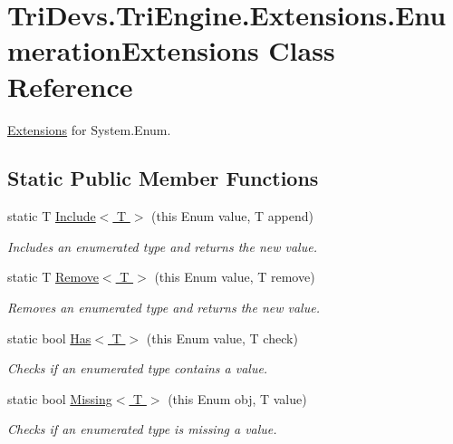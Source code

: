 \hypertarget{class_tri_devs_1_1_tri_engine_1_1_extensions_1_1_enumeration_extensions}{\section{Tri\-Devs.\-Tri\-Engine.\-Extensions.\-Enumeration\-Extensions Class Reference}
\label{class_tri_devs_1_1_tri_engine_1_1_extensions_1_1_enumeration_extensions}
}


\hyperlink{namespace_tri_devs_1_1_tri_engine_1_1_extensions}{Extensions} for System.\-Enum.  


\subsection*{Static Public Member Functions}
\begin{DoxyCompactItemize}
\item 
static T \hyperlink{class_tri_devs_1_1_tri_engine_1_1_extensions_1_1_enumeration_extensions_aad91b6ef2b6677680616dd41b4dce21c}{Include$<$ T $>$} (this Enum value, T append)
\begin{DoxyCompactList}\small\item\em Includes an enumerated type and returns the new value. \end{DoxyCompactList}\item 
static T \hyperlink{class_tri_devs_1_1_tri_engine_1_1_extensions_1_1_enumeration_extensions_a749b500dccfb35ad79597576f2381f08}{Remove$<$ T $>$} (this Enum value, T remove)
\begin{DoxyCompactList}\small\item\em Removes an enumerated type and returns the new value. \end{DoxyCompactList}\item 
static bool \hyperlink{class_tri_devs_1_1_tri_engine_1_1_extensions_1_1_enumeration_extensions_a1f2fd116ac22546b6e1c8fd3e6a94b27}{Has$<$ T $>$} (this Enum value, T check)
\begin{DoxyCompactList}\small\item\em Checks if an enumerated type contains a value. \end{DoxyCompactList}\item 
static bool \hyperlink{class_tri_devs_1_1_tri_engine_1_1_extensions_1_1_enumeration_extensions_a8903ed079f6f591f42791f19f7921c7b}{Missing$<$ T $>$} (this Enum obj, T value)
\begin{DoxyCompactList}\small\item\em Checks if an enumerated type is missing a value. \end{DoxyCompactList}\end{DoxyCompactItemize}


